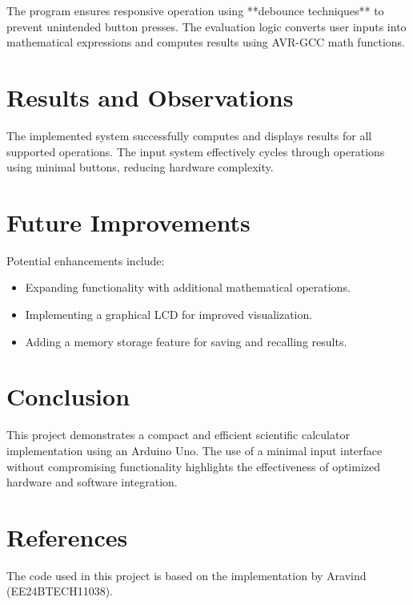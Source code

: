 \documentclass[journal]{IEEEtran}
\begin{document}
The program ensures responsive operation using **debounce techniques** to prevent unintended button presses. The evaluation logic converts user inputs into mathematical expressions and computes results using AVR-GCC math functions.

\section{Results and Observations}
The implemented system successfully computes and displays results for all supported operations. The input system effectively cycles through operations using minimal buttons, reducing hardware complexity.

\section{Future Improvements}
Potential enhancements include:
\begin{itemize}
    \item Expanding functionality with additional mathematical operations.
    \item Implementing a graphical LCD for improved visualization.
    \item Adding a memory storage feature for saving and recalling results.
\end{itemize}

\section{Conclusion}
This project demonstrates a compact and efficient scientific calculator implementation using an Arduino Uno. The use of a minimal input interface without compromising functionality highlights the effectiveness of optimized hardware and software integration.
\section{References}
The code used in this project is based on the implementation by Aravind (EE24BTECH11038).
\end{document}
